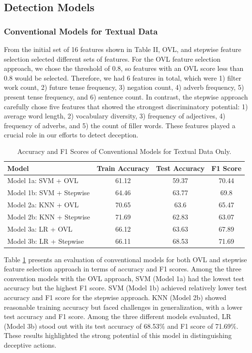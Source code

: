 \documentclass[12pt]{article}
\begin{document}
\subsection{Detection Models}
\subsubsection{Conventional Models for Textual Data}
From the initial set of 16 features shown in Table II, OVL, and stepwise feature selection selected different sets of features. For the OVL feature selection approach, we chose the threshold of 0.8, so features with an OVL score less than 0.8 would be selected. Therefore, we had 6 features in total, which were 1) filter work count, 2) future tense frequency, 3) negation count, 4) adverb frequency, 5) present tense frequency, and 6) sentence count. 
In contrast, the stepwise approach carefully chose five features that showed the strongest discriminatory potential: 1) average word length, 2) vocabulary diversity, 3) frequency of adjectives, 4) frequency of adverbs, and 5) the count of filler words. These features played a crucial role in our efforts to detect deception.

 
\begin{table}[H]
\centering
\begin{tabular}{l c c c}
\hline
\textbf{Model} & \textbf{Train Accuracy} & \textbf{Test Accuracy} & \textbf{F1 Score} \\
\hline
Model 1a: SVM + OVL & 61.12 & 59.37 & 70.44 \\
Model 1b: SVM + Stepwise & 64.46 & 63.77 & 69.8 \\
Model 2a: KNN + OVL & 70.65 & 63.6 & 65.47 \\
Model 2b: KNN + Stepwise & 71.69 & 62.83 & 63.07 \\
Model 3a: LR  + OVL & 66.12 & 63.63 & 67.89 \\
Model 3b: LR  + Stepwise & 66.11 & 68.53 & 71.69 \\
\hline
\end{tabular}
\caption{Accuracy and F1 Scores of Conventional Models for Textual Data Only.}
\label{tab:ResultCon}
\end{table}


Table \ref{tab:ResultCon} presents an evaluation of conventional models for both OVL and stepwise feature selection approach in terms of accuracy and F1 scores. Among the three convention models with the OVL approach, SVM (Model 1a) had the lowest test accuracy but the highest F1 score. SVM (Model 1b) achieved relatively lower test accuracy and F1 score for the stepwise approach. KNN (Model 2b) showed reasonable training accuracy but faced challenges in generalization, with a lower test accuracy and F1 score. Among the three different models evaluated, LR (Model 3b) stood out with its test accuracy of 68.53$\%$ and F1 score of 71.69$\%$. These results highlighted the strong potential of this model in distinguishing deceptive actions.
\end{document}
